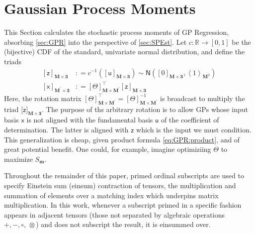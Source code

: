 \documentclass[preprint,12pt]{elsarticle}
\newcommand*{\M}[1]{\ensuremath{#1}\xspace}
\newcommand*{\x}{\times}
\newcommand*{\mi}[1]{\mathbf{#1}}
\newcommand*{\st}[1]{\mathbb{#1}}
\newcommand*{\rv}[1]{\mathsf{#1}}
\newcommand*{\te}[2][]{\left\lbrack{#2}\right\rbrack_{#1}}
\newcommand*{\tte}[2][]{\lbrack{#2}\rbrack_{#1}}
\newcommand*{\diag}[2][]{\left\langle{#2}\right\rangle_{#1}}
\newcommand*{\deq}{\M{\mathrel{\mathop:}=}}
\newcommand*{\gauss}[2]{\mathsf{N}\!\left({#1,#2}\right)}
\begin{document}
\section{Gaussian Process Moments}\label{sec:GPMom}
    This Section calculates the stochastic process moments of GP Regression, absorbing \cref{sec:GPR} into the perspective of \cref{sec:SPEst}.
    Let $c\colon \st{R} \to [0,1]$ be the (bijective) CDF of the standard, univariate normal distribution, and define the triads
    \begin{equation*}
        \begin{aligned}
            \te[\mi{M\x 3}]{\rv{z}} &\deq c^{-1}\!\left(\te[\mi{M\x 3}]
            {\rv{u}}\right) \sim \gauss{\te[\mi{M\x 3}]{0}}{\diag[\mi{M}^{2}]{1}} \\
            \te[\mi{M^{\prime}\x 3}]{\rv{x}} &\deq \te[\mi{M\x M^{\prime}}]{\Theta}^{\intercal} \te[\mi{M\x 3}]{\rv{z}}
        \end{aligned}
    \end{equation*}
    Here, the rotation matrix $\te[\mi{M\x M^{\prime}}]{\Theta}^{\intercal} = \te[\mi{M\x M^{\prime}}]{\Theta}^{-1}$ is broadcast to multiply the triad $\tte[\mi{M\x 3}]{\rv{z}}$. 
    The purpose of ths arbitrary rotation is to allow GPs whose input basis $\rv{x}$ is not aligned with the fundamental basis $\rv{u}$ of the coefficient of determination. The latter is aligned with $\rv{z}$ which is the input we must condition. This generalization is cheap, given product formula \cref{eq:GPR:product}, and of great potential benefit. One could, for example, imagine optimiziing $\Theta$ to maximize $S_{\mi{m}}$.
    
    Throughout the remainder of this paper, primed ordinal subscripts are used to specify Einstein sum (einsum) contraction of tensors, the multiplication and summation of elements over a matching index which underpins matrix multiplication. In this work, whenever a subscript primed in a specific fashion appears in adjacent tensors (those not separated by algebraic operations $+,-,\circ,\,\otimes$) and does not subscript the result, it is einsummed over.
    
\end{document}
